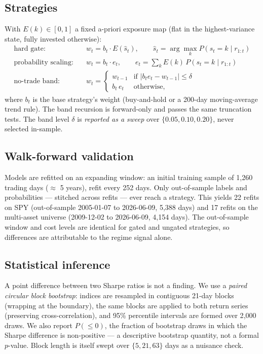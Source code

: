 \documentclass[11pt]{article}
\begin{document}
\subsection{Strategies}

With $E(k) \in [0,1]$ a fixed a-priori exposure map (flat in the
highest-variance state, fully invested otherwise):
\begin{align}
  \text{hard gate:} \quad & w_t = b_t \cdot E\!\left(\hat{s}_t\right),
    \qquad \hat{s}_t = \arg\max_k P(s_t = k \mid r_{1:t}) \\
  \text{probability scaling:} \quad & w_t = b_t \cdot e_t,
    \qquad e_t = \sum_k E(k)\, P(s_t = k \mid r_{1:t}) \\
  \text{no-trade band:} \quad & w_t =
    \begin{cases}
      w_{t-1} & \text{if } \lvert b_t e_t - w_{t-1} \rvert \le \delta \\
      b_t\, e_t & \text{otherwise,}
    \end{cases}
\end{align}
where $b_t$ is the base strategy's weight (buy-and-hold or a 200-day
moving-average trend rule). The band recursion is forward-only and passes the
same truncation tests. The band level $\delta$ is \emph{reported as a sweep}
over $\{0.05, 0.10, 0.20\}$, never selected in-sample.

\subsection{Walk-forward validation}

Models are refitted on an expanding window: an initial training sample of
1{,}260 trading days ($\approx$ 5 years), refit every 252 days. Only
out-of-sample labels and probabilities --- stitched across refits --- ever
reach a strategy. This yields 22 refits on SPY (out-of-sample 2005-01-07 to
2026-06-09, 5{,}388 days) and 17 refits on the multi-asset universe
(2009-12-02 to 2026-06-09, 4{,}154 days). The out-of-sample window and cost
levels are identical for gated and ungated strategies, so differences are
attributable to the regime signal alone.

\subsection{Statistical inference}

A point difference between two Sharpe ratios is not a finding. We use a
\emph{paired circular block bootstrap}: indices are resampled in contiguous
21-day blocks (wrapping at the boundary), the same blocks are applied to both
return series (preserving cross-correlation), and 95\% percentile intervals
are formed over 2{,}000 draws. We also report
$P(\le 0)$, the fraction of bootstrap draws in which the Sharpe difference is
non-positive --- a descriptive bootstrap quantity, not a formal $p$-value.
Block length is itself swept over $\{5, 21, 63\}$ days as a nuisance check.
\end{document}
